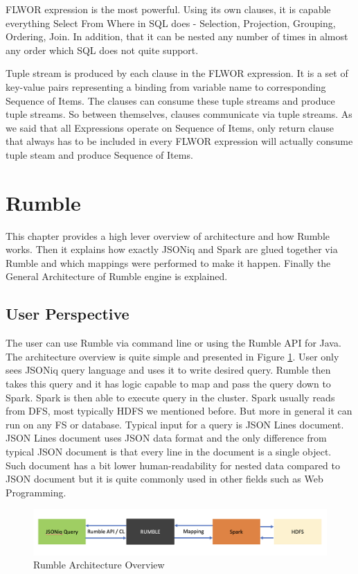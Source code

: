 FLWOR expression is the most powerful. Using its own clauses, it is capable everything Select From Where in SQL does - Selection, Projection, Grouping, Ordering, Join. In addition, that it can be nested any number of times in almost any order which SQL does not quite support. \cite{JSONiqBook}

Tuple stream is produced by each clause in the FLWOR expression. It is a set of key-value pairs representing a binding from variable name to corresponding Sequence of Items. The clauses can consume these tuple streams and produce tuple streams. So between themselves, clauses communicate via tuple streams. As we said that all Expressions operate on Sequence of Items, only return clause that always has to be included in every FLWOR expression will actually consume tuple steam and produce Sequence of Items. \cite{JSONiqBook}
   
\section{Rumble}
This chapter provides a high lever overview of architecture and how Rumble works. Then it explains how exactly JSONiq and Spark are glued together via Rumble and which mappings were performed to make it happen. Finally the General Architecture of Rumble engine is explained.
\subsection{User Perspective}
The user can use Rumble via command line or using the Rumble API for Java. The architecture overview is quite simple and presented in Figure \ref{fig:Rumble_Architecture}. User only sees JSONiq query language and uses it to write desired query. Rumble then takes this query and it has logic capable to map and pass the query down to Spark. Spark is then able to execute query in the cluster. Spark usually reads from DFS, most typically HDFS we mentioned before. But more in general it can run on any FS or database. Typical input for a query is JSON Lines document. JSON Lines document uses JSON data format and the only difference from typical JSON document is that every line in the document is a single object. Such document has a bit lower human-readability for nested data compared to JSON document but it is quite commonly used in other fields such as Web Programming. \cite{RumbleYouTube}

\begin{figure}[h!]
	\vspace*{-5mm}
	\includegraphics[width=\linewidth]{rumble_architecture.png}
	\vspace*{-10mm}
	\caption{Rumble Architecture Overview}
	\label{fig:Rumble_Architecture}
\end{figure}

